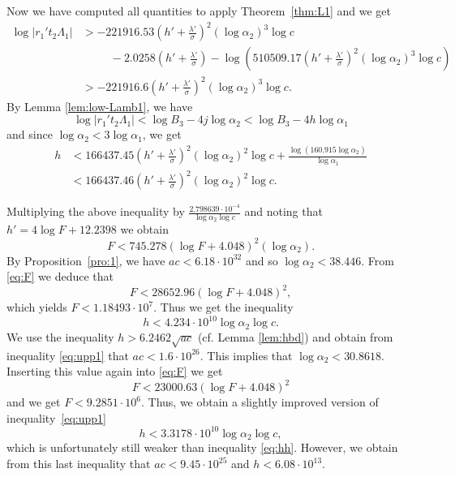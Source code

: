 \documentclass{amsart}
\theoremstyle{definition}
\begin{document}
Now we have computed all quantities to apply Theorem~\ref{thm:L1} and we get
\begin{align*}
\log |r_1't_2 \Lambda_1 |&> -  221916.53\left(h'+\frac{\lambda'}{\sigma}\right)^2(\log\alpha_2)^3\log c\\
&\phantom{00000} -2.0258\left(h'+\frac{\lambda'}{\sigma}\right)
-\log\left( 510509.17 \left(h'+\frac{\lambda'}{\sigma}\right)^2(\log\alpha_2)^3\log c\right)\\
&>-221916.6\left(h'+\frac{\lambda'}{\sigma}\right)^2(\log\alpha_2)^3\log c.
\end{align*}
By Lemma \ref{lem:low-Lamb1}, we have 
$$
\log |r_1't_2 \Lambda_1 |<\log B_3-4j\log\alpha_2 < \log B_3-4h \log \alpha_1
$$
 and since $\log\alpha_2 < 3\log \alpha_1$, we get 
 \begin{align*}
 h &<166437.45\left(h'+\frac{\lambda'}{\sigma}\right)^2(\log\alpha_2)^2\log c + \frac{\log(160.915\log \alpha_2)}{\log\alpha_1}\\
 &<166437.46\left(h'+\frac{\lambda'}{\sigma}\right)^2(\log\alpha_2)^2\log c.
\end{align*}

Multiplying the above inequality by $\frac{2.798639\cdot10^{-4}}{\log \alpha_2 \log c}$ and noting that $h'= 4\log F+12.2398$
we obtain
\begin{equation}\label{eq:F}
F<745.278\left(\log F+4.048\right)^2(\log\alpha_2).
\end{equation}
By Proposition~\ref{pro:1}, we have $ac<6.18\cdot 10^{32}$ and so $\log\alpha_2 < 38.446$. From \eqref{eq:F} we deduce that 
$$
F < 28652.96(\log F+4.048)^2, 
$$
which yields $F<1.18493\cdot 10^7$. Thus we get the inequality 
\begin{equation}\label{eq:upp1}
h<4.234\cdot 10^{10}\log \alpha_2 \log c.
\end{equation}
We use the inequality $h>6.2462\sqrt{ac}$ (cf. Lemma \ref{lem:hbd}) and
obtain from inequality \eqref{eq:upp1} that $ac<1.6\cdot 10^{26}$. This implies that $\log\alpha_2<30.8618$. 
Inserting this value again into \eqref{eq:F} we get
$$
F < 23000.63(\log F+4.048)^2
$$
and we get $F<9.2851\cdot 10^6$. Thus, we obtain a slightly improved version of inequality~\eqref{eq:upp1}
\begin{equation}\label{eq:upp2}
h<3.3178\cdot 10^{10}\log \alpha_2 \log c,
\end{equation}
which is unfortunately still weaker than inequality \eqref{eq:hh}. However, we
obtain from this last inequality that $ac<9.45\cdot 10^{25}$ and $h<6.08\cdot 10^{13}$.
\end{document}
